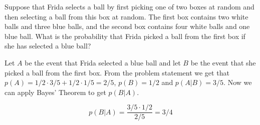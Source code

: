 \documentclass[../main.tex]{subfiles}
\begin{document}
Suppose that Frida selects a ball by first picking one of two boxes at random and then selecting a ball from this box at random.
The first box contains two white balls and three blue balls, and the second box contains four white balls and one blue ball.
What is the probability that Frida picked a ball from the first box if she has selected a blue ball?

\solution

Let $A$ be the event that Frida selected a blue ball and let $B$ be the event that she picked a ball from the first box.
From the problem statement we get that $p(A) = 1/2 \cdot 3/5 + 1/2 \cdot 1/5 = 2/5$, $p(B) = 1/2$ and $p(A|B) = 3/5$. Now we can apply Bayes' Theorem
to get $p(B|A)$.

\[ p(B|A) = \frac{3/5 \cdot 1/2}{2/5} = 3/4 \]
\end{document}
